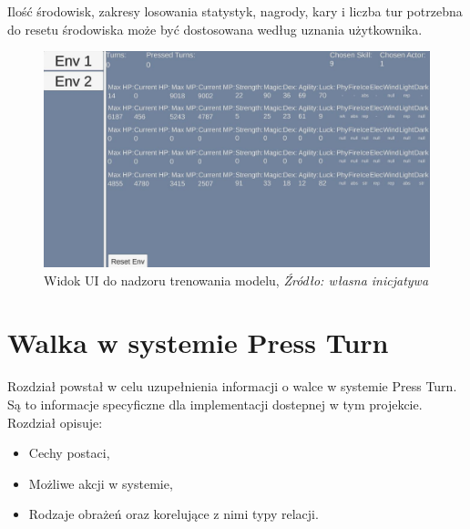 \documentclass{SGGW-thesis}
\begin{document}
Ilość środowisk, zakresy losowania statystyk, nagrody, kary i liczba tur potrzebna do resetu środowiska może być dostosowana według uznania użytkownika.
\begin{figure}[H]
  \includegraphics[width=1\textwidth]{trainingui.JPG}
  \caption{Widok UI do nadzoru trenowania modelu, \textit{Źródło: własna inicjatywa}}
\end{figure}
\pagebreak
\section{Walka w systemie Press Turn}
\label{systempressturn}
Rozdział powstał w celu uzupełnienia informacji o walce w systemie Press Turn. Są to informacje specyficzne dla implementacji dostepnej w tym projekcie. 
Rozdział opisuje:
\begin{itemize}
  \item Cechy postaci,
  \item Możliwe akcji w systemie,
  \item Rodzaje obrażeń oraz korelujące z nimi typy relacji.
\end{itemize}
\end{document}
